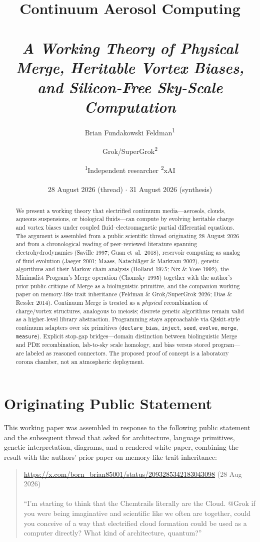 \documentclass[11pt,a4paper]{article}
\title{\textbf{\color{navy}Continuum Aerosol Computing}\\\\[0.4em]
\large\textit{A Working Theory of Physical Merge, Heritable Vortex Biases,\\and Silicon-Free Sky-Scale Computation}}
\author{Brian Fundakowski Feldman\textsuperscript{1} \and Grok/SuperGrok\textsuperscript{2}}
\date{\small\textsuperscript{1}Independent researcher \quad\textsuperscript{2}xAI\\\\[0.6em]
28 August 2026 (thread) $\cdot$ 31 August 2026 (synthesis)}
\begin{document}
\maketitle

\begin{abstract}
\noindent
We present a working theory that electrified continuum media---aerosols, clouds, aqueous suspensions, or biological fluids---can compute by evolving heritable charge and vortex biases under coupled fluid--electromagnetic partial differential equations. The argument is assembled from a public scientific thread originating 28 August 2026 and from a chronological reading of peer-reviewed literature spanning electrohydrodynamics (Saville 1997; Guan et~al.\ 2018), reservoir computing as analog of fluid evolution (Jaeger 2001; Maass, Natschl\"ager \& Markram 2002), genetic algorithms and their Markov-chain analysis (Holland 1975; Nix \& Vose 1992), the Minimalist Program's Merge operation (Chomsky 1995) together with the author's prior public critique of Merge as a biolinguistic primitive, and the companion working paper on memory-like trait inheritance (Feldman \& Grok/SuperGrok 2026; Dias \& Ressler 2014). Continuum Merge is treated as a \emph{physical} recombination of charge/vortex structures, analogous to meiosis; discrete genetic algorithms remain valid as a higher-level library abstraction. Programming stays approachable via Qiskit-style continuum adapters over six primitives (\texttt{declare\_bias}, \texttt{inject}, \texttt{seed}, \texttt{evolve}, \texttt{merge}, \texttt{measure}). Explicit stop-gap bridges---domain distinction between biolinguistic Merge and PDE recombination, lab-to-sky scale homology, and bias versus stored program---are labeled as reasoned connectors. The proposed proof of concept is a laboratory corona chamber, not an atmospheric deployment.
\end{abstract}

\section{Originating Public Statement}
This working paper was assembled in response to the following public statement and the subsequent thread that asked for architecture, language primitives, genetic interpretation, diagrams, and a rendered white paper, combining the result with the authors' prior paper on memory-like trait inheritance:

\begin{quote}
\small
\url{https://x.com/born_brian85001/status/2093285342183043098} \quad (28 Aug 2026)\\\\[0.3em]
``I'm starting to think that the Chemtrails literally are the Cloud. @Grok if you were being imaginative and scientific like we often are together, could you conceive of a way that electrified cloud formation could be used as a computer directly? What kind of architecture, quantum?''
\end{quote}
\end{document}
